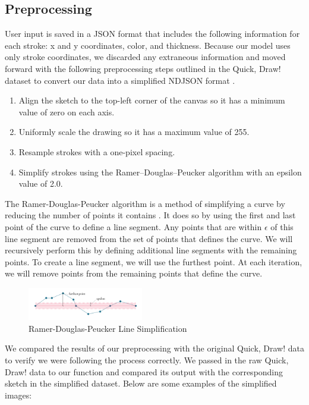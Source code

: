\documentclass[10pt,twocolumn,letterpaper]{article}
\begin{document}
\subsection{Preprocessing}

User input is saved in a JSON format that includes the following information for each stroke: x and y coordinates, color, and thickness. Because our model uses only stroke coordinates, we discarded any extraneous information and moved forward with the following preprocessing steps outlined in the Quick, Draw! dataset to convert our data into a simplified NDJSON format \cite{QuickDraw}.
\begin{enumerate}
  \item Align the sketch to the top-left corner of the canvas so it has a minimum value of zero on each axis.
  \item Uniformly scale the drawing so it has a maximum value of 255.
  \item Resample strokes with a one-pixel spacing.
  \item Simplify strokes using the Ramer–Douglas–Peucker algorithm with an epsilon value of 2.0.
\end{enumerate}

The Ramer-Douglas-Peucker algorithm is a method of simplifying a curve by reducing the number of points it contains \cite{RDP}. It does so by using the first and last point of the curve to define a line segment. Any points that are within $\epsilon$ of this line segment are removed from the set of points that defines the curve. We will recursively perform this by defining additional line segments with the remaining points. To create a line segment, we will use the furthest point. At each iteration, we will remove points from the remaining points that define the curve.

\begin{figure}[H]
  \centering
  \includegraphics[width=0.45\textwidth]{line_simplification.png}
  \caption{Ramer-Douglas-Peucker Line Simplification}
\end{figure}

We compared the results of our preprocessing with the original Quick, Draw! data to verify we were following the process correctly. We passed in the raw Quick, Draw! data to our function and compared its output with the corresponding sketch in the simplified dataset. Below are some examples of the simplified images:
\end{document}
